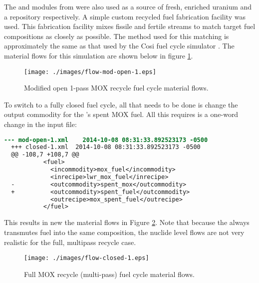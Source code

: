 The  and  modules from \Cycamore were also used as a
source of fresh, enriched uranium and a repository respectively. A simple
custom recycled fuel fabrication facility was used.  This fabrication facility
mixes fissile and fertile streams to match target fuel compositions as closely
as possible.  The method used for this matching is approximately the same as
that used by the Cosi fuel cycle simulator . The material flows for this simulation are shown below in figure
\ref{fig:flowmodopen}.

\begin{figure}[H]
\label{fig:flowmodopen}
\caption{Modified open 1-pass MOX recycle fuel cycle material flows.}
\begin{center}
\texttt{[image: ./images/flow-mod-open-1.eps]}
\end{center}
\end{figure}

To switch to a fully closed fuel cycle, all that needs to be done is change
the output commodity for the 's spent MOX fuel.  All this
requires is a one-word change in the input file: 

\begin{lstlisting}[language=diff]
  --- mod-open-1.xml	2014-10-08 08:31:33.892523173 -0500
  +++ closed-1.xml	2014-10-08 08:31:33.892523173 -0500
  @@ -108,7 +108,7 @@
           <fuel>         
             <incommodity>mox_fuel</incommodity>
             <inrecipe>lwr_mox_fuel</inrecipe>
  -          <outcommodity>spent_mox</outcommodity>
  +          <outcommodity>spent_fuel</outcommodity>
             <outrecipe>mox_spent_fuel</outrecipe>
           </fuel>
\end{lstlisting}

This results in new the material flows in Figure \ref{fig:flowclosed}. Note
that because the  always transmutes fuel into the same
composition, the nuclide level flows are not very realistic for the full, multipass
recycle case.

\begin{figure}[H]
\label{fig:flowclosed}
\caption{Full MOX recycle (multi-pass) fuel cycle material flows.}
\begin{center}
\texttt{[image: ./images/flow-closed-1.eps]}
\end{center}
\end{figure}

